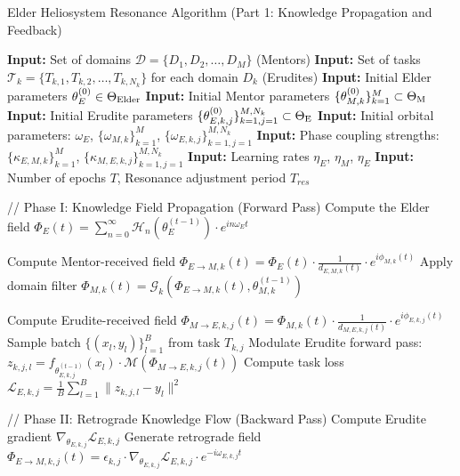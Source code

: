 \begin{algorithm}
\caption{Elder Heliosystem Resonance Algorithm (Part 1: Knowledge Propagation and Feedback)}
\begin{algorithmic}[1]
\State \textbf{Input:} Set of domains $\mathcal{D} = \{D_1, D_2, \ldots, D_M\}$ (Mentors)
\State \textbf{Input:} Set of tasks $\mathcal{T}_k = \{T_{k,1}, T_{k,2}, \ldots, T_{k,N_k}\}$ for each domain $D_k$ (Erudites)
\State \textbf{Input:} Initial Elder parameters $\theta_E^{(0)} \in \Theta_{\text{Elder}}$
\State \textbf{Input:} Initial Mentor parameters $\{\theta_{M,k}^{(0)}\}_{k=1}^M \subset \Theta_{\text{M}}$
\State \textbf{Input:} Initial Erudite parameters $\{\theta_{E,k,j}^{(0)}\}_{k=1,j=1}^{M,N_k} \subset \Theta_{\text{E}}$
\State \textbf{Input:} Initial orbital parameters: $\omega_E$, $\{\omega_{M,k}\}_{k=1}^M$, $\{\omega_{E,k,j}\}_{k=1,j=1}^{M,N_k}$
\State \textbf{Input:} Phase coupling strengths: $\{\kappa_{E,M,k}\}_{k=1}^M$, $\{\kappa_{M,E,k,j}\}_{k=1,j=1}^{M,N_k}$
\State \textbf{Input:} Learning rates $\eta_E$, $\eta_M$, $\eta_E$
\State \textbf{Input:} Number of epochs $T$, Resonance adjustment period $T_{res}$

    \State // Phase I: Knowledge Field Propagation (Forward Pass)
    \State Compute the Elder field $\Phi_E(t) = \sum_{n=0}^{\infty} \mathcal{H}_n(\theta_E^{(t-1)}) \cdot e^{in\omega_E t}$
    
        \State Compute Mentor-received field $\Phi_{E \rightarrow M,k}(t) = \Phi_E(t) \cdot \frac{1}{d_{E,M,k}(t)} \cdot e^{i\phi_{M,k}(t)}$
        \State Apply domain filter $\Phi_{M,k}(t) = \mathcal{G}_k(\Phi_{E \rightarrow M,k}(t), \theta_{M,k}^{(t-1)})$
        
            \State Compute Erudite-received field $\Phi_{M \rightarrow E,k,j}(t) = \Phi_{M,k}(t) \cdot \frac{1}{d_{M,E,k,j}(t)} \cdot e^{i\phi_{E,k,j}(t)}$
            \State Sample batch $\{(x_l, y_l)\}_{l=1}^B$ from task $T_{k,j}$
            \State Modulate Erudite forward pass:
            \State \quad $z_{k,j,l} = f_{\theta_{E,k,j}^{(t-1)}}(x_l) \cdot \mathcal{M}(\Phi_{M \rightarrow E,k,j}(t))$
            \State Compute task loss $\mathcal{L}_{E,k,j} = \frac{1}{B}\sum_{l=1}^B \|z_{k,j,l} - y_l\|^2$
        \EndFor
    \EndFor
    
    \State // Phase II: Retrograde Knowledge Flow (Backward Pass)
            \State Compute Erudite gradient $\nabla_{\theta_{E,k,j}} \mathcal{L}_{E,k,j}$
            \State Generate retrograde field $\Phi_{E \rightarrow M,k,j}(t) = \epsilon_{k,j} \cdot \nabla_{\theta_{E,k,j}}\mathcal{L}_{E,k,j} \cdot e^{-i\omega_{E,k,j}t}$
        \EndFor
        

\end{algorithmic}
\end{algorithm}
